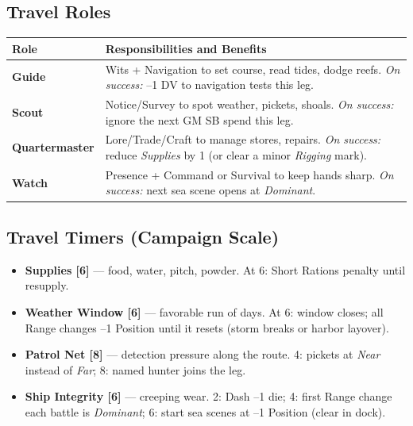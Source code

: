 \documentclass[11pt,oneside]{book}
\begin{document}
\begin{itemize}
\subsection*{Travel Roles}
\begin{tabularx}{\linewidth}{@{}p{2.6cm} X@{}}
\toprule
\textbf{Role} & \textbf{Responsibilities and Benefits}\\
\midrule
\textbf{Guide} & Wits + Navigation to set course, read tides, dodge reefs. \emph{On success:} --1 DV to navigation tests this leg.\\
\textbf{Scout} & Notice/Survey to spot weather, pickets, shoals. \emph{On success:} ignore the next GM SB spend this leg.\\
\textbf{Quartermaster} & Lore/Trade/Craft to manage stores, repairs. \emph{On success:} reduce \textit{Supplies} by 1 (or clear a minor \textit{Rigging} mark).\\
\textbf{Watch} & Presence + Command or Survival to keep hands sharp. \emph{On success:} next sea scene opens at \emph{Dominant}.\\
\bottomrule
\end{tabularx}

\subsection*{Travel Timers (Campaign Scale)}
\begin{itemize}[leftmargin=*,itemsep=2pt]
  \item \textbf{Supplies [6]} --- food, water, pitch, powder. At 6: Short Rations penalty until resupply.
  \item \textbf{Weather Window [6]} --- favorable run of days. At 6: window closes; all Range changes --1 Position until it resets (storm breaks or harbor layover).
  \item \textbf{Patrol Net [8]} --- detection pressure along the route. 4: pickets at \emph{Near} instead of \emph{Far}; 8: named hunter joins the leg.
  \item \textbf{Ship Integrity [6]} --- creeping wear. 2: Dash --1 die; 4: first Range change each battle is \emph{Dominant}; 6: start sea scenes at --1 Position (clear in dock).
\end{itemize}


\end{itemize}
\end{document}
